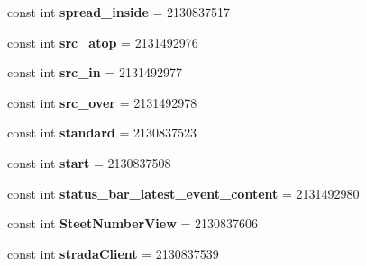 \begin{DoxyCompactItemize}
\item 
\mbox{\label{classst_delivery_1_1_resource_1_1_id_abd2d3875a47edd738fbd8d64ba4c87e3}} 
const int {\bfseries spread\+\_\+inside} = 2130837517
\item 
\mbox{\label{classst_delivery_1_1_resource_1_1_id_afaf4327bd317bd5c29680250f2ee95ba}} 
const int {\bfseries src\+\_\+atop} = 2131492976
\item 
\mbox{\label{classst_delivery_1_1_resource_1_1_id_a30ca463d108b740a85a0d4d8d21bd8ab}} 
const int {\bfseries src\+\_\+in} = 2131492977
\item 
\mbox{\label{classst_delivery_1_1_resource_1_1_id_a29f780169cfc9deed7be714c3c98f5aa}} 
const int {\bfseries src\+\_\+over} = 2131492978
\item 
\mbox{\label{classst_delivery_1_1_resource_1_1_id_accedc3e1a4204be9eb4ee06e501ce4ee}} 
const int {\bfseries standard} = 2130837523
\item 
\mbox{\label{classst_delivery_1_1_resource_1_1_id_ad1f0a87b1df995c27a503835759d681f}} 
const int {\bfseries start} = 2130837508
\item 
\mbox{\label{classst_delivery_1_1_resource_1_1_id_a82a64d3bc4f2ad697e622439c443bb8c}} 
const int {\bfseries status\+\_\+bar\+\_\+latest\+\_\+event\+\_\+content} = 2131492980
\item 
\mbox{\label{classst_delivery_1_1_resource_1_1_id_a6650d5a1323d97bfc8e5d9d866a34736}} 
const int {\bfseries Steet\+Number\+View} = 2130837606
\item 
\mbox{\label{classst_delivery_1_1_resource_1_1_id_a38e00aa0b1856ff6d73382178e19e69e}} 
const int {\bfseries strada\+Client} = 2130837539
\item 
\mbox{\label{classst_delivery_1_1_resource_1_1_id_a3d59208ccd6edcf4bfe22ec97d80fbbc}} 

\end{DoxyCompactItemize}
